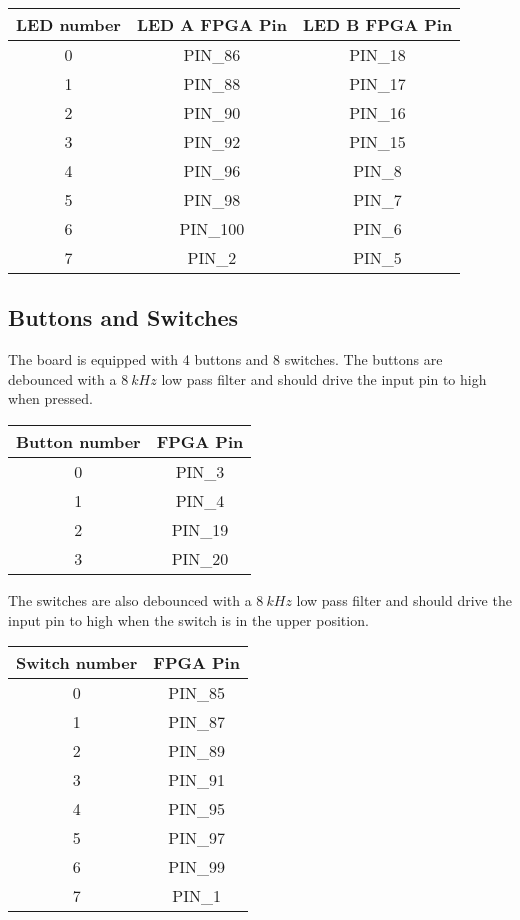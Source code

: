 \begin{center}
	\begin{tabular}{c c c}
		LED number & LED A FPGA Pin & LED B FPGA Pin \\
		\hline
		0 & PIN\_86 & PIN\_18 \\
		1 & PIN\_88 & PIN\_17 \\
		2 & PIN\_90 & PIN\_16 \\
		3 & PIN\_92 & PIN\_15 \\
		4 & PIN\_96 & PIN\_8 \\
		5 & PIN\_98 & PIN\_7 \\
		6 & PIN\_100 & PIN\_6 \\
		7 & PIN\_2 & PIN\_5 \\
		\hline
	\end{tabular}
\end{center}

\subsection{Buttons and Switches}
The board is equipped with 4 buttons and 8 switches.
The buttons are debounced with a $\SI{8}{kHz}$ low pass filter and should drive the input pin to high when pressed.

\begin{center}
	\begin{tabular}{c c}
		Button number & FPGA Pin \\
		\hline
		0 & PIN\_3 \\
		1 & PIN\_4 \\
		2 & PIN\_19 \\
		3 & PIN\_20 \\
		\hline
	\end{tabular}
\end{center}

The switches are also debounced with a $\SI{8}{kHz}$ low pass filter and should drive the input pin to high when the switch is in the upper position.

\begin{center}
	\begin{tabular}{c c}
		Switch number & FPGA Pin \\
		\hline
		0 & PIN\_85 \\
		1 & PIN\_87 \\
		2 & PIN\_89 \\
		3 & PIN\_91 \\
		4 & PIN\_95 \\
		5 & PIN\_97 \\
		6 & PIN\_99 \\
		7 & PIN\_1 \\
		\hline
	\end{tabular}
\end{center}

